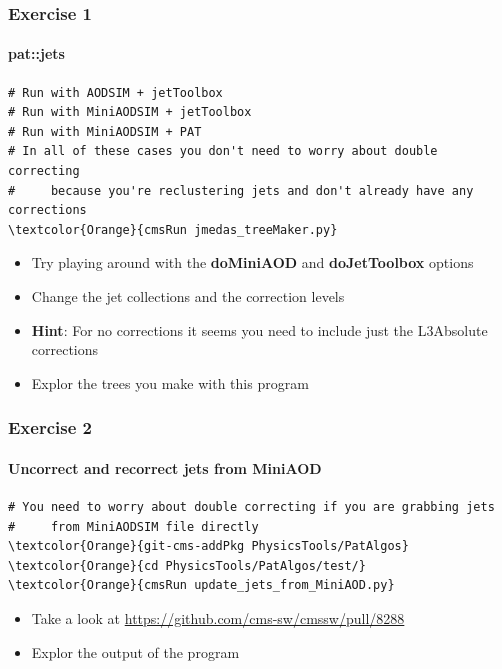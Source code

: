 \begin{frame}[fragile]
	\frametitle{Exercise 1}
	\framesubtitle{pat::jets}

\begin{Verbatim}[label={Exercise 1}]
# Run with AODSIM + jetToolbox
# Run with MiniAODSIM + jetToolbox
# Run with MiniAODSIM + PAT
# In all of these cases you don't need to worry about double correcting
#     because you're reclustering jets and don't already have any corrections
\textcolor{Orange}{cmsRun jmedas_treeMaker.py}
\end{Verbatim}

\begin{block}{}
	\begin{itemize}
		\item Try playing around with the \textbf{doMiniAOD} and \textbf{doJetToolbox} options
		\item Change the jet collections and the correction levels
		\item \textbf{Hint}: For no corrections it seems you need to include just the L3Absolute corrections
		\item Explor the trees you make with this program
	\end{itemize}
\end{block}

\end{frame}

\begin{frame}[fragile]
	\frametitle{Exercise 2}
	\framesubtitle{Uncorrect and recorrect jets from MiniAOD}

\begin{Verbatim}[label={Exercise 2}]
# You need to worry about double correcting if you are grabbing jets
#     from MiniAODSIM file directly
\textcolor{Orange}{git-cms-addPkg PhysicsTools/PatAlgos}
\textcolor{Orange}{cd PhysicsTools/PatAlgos/test/}
\textcolor{Orange}{cmsRun update_jets_from_MiniAOD.py}
\end{Verbatim}

\begin{block}{}
	\begin{itemize}
		\item Take a look at \href{https://github.com/cms-sw/cmssw/pull/8288}{https://github.com/cms-sw/cmssw/pull/8288}
		\item Explor the output of the program
	\end{itemize}
\end{block}

\end{frame}

